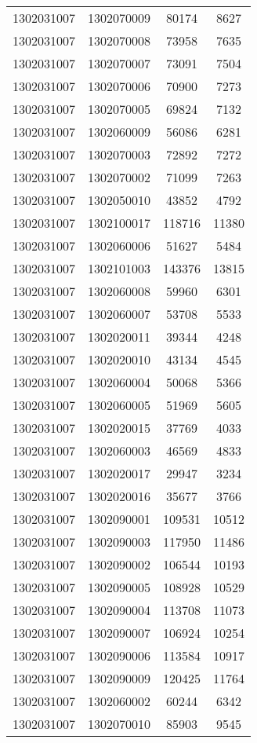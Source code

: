 \begin{longtable}[h]{llcc}
		1302031007 & 1302070009 & 80174 & 8627\\
		1302031007 & 1302070008 & 73958 & 7635\\
		1302031007 & 1302070007 & 73091 & 7504\\
		1302031007 & 1302070006 & 70900 & 7273\\
		1302031007 & 1302070005 & 69824 & 7132\\
		1302031007 & 1302060009 & 56086 & 6281\\
		1302031007 & 1302070003 & 72892 & 7272\\
		1302031007 & 1302070002 & 71099 & 7263\\
		1302031007 & 1302050010 & 43852 & 4792\\
		1302031007 & 1302100017 & 118716 & 11380\\
		1302031007 & 1302060006 & 51627 & 5484\\
		1302031007 & 1302101003 & 143376 & 13815\\
		1302031007 & 1302060008 & 59960 & 6301\\
		1302031007 & 1302060007 & 53708 & 5533\\
		1302031007 & 1302020011 & 39344 & 4248\\
		1302031007 & 1302020010 & 43134 & 4545\\
		1302031007 & 1302060004 & 50068 & 5366\\
		1302031007 & 1302060005 & 51969 & 5605\\
		1302031007 & 1302020015 & 37769 & 4033\\
		1302031007 & 1302060003 & 46569 & 4833\\
		1302031007 & 1302020017 & 29947 & 3234\\
		1302031007 & 1302020016 & 35677 & 3766\\
		1302031007 & 1302090001 & 109531 & 10512\\
		1302031007 & 1302090003 & 117950 & 11486\\
		1302031007 & 1302090002 & 106544 & 10193\\
		1302031007 & 1302090005 & 108928 & 10529\\
		1302031007 & 1302090004 & 113708 & 11073\\
		1302031007 & 1302090007 & 106924 & 10254\\
		1302031007 & 1302090006 & 113584 & 10917\\
		1302031007 & 1302090009 & 120425 & 11764\\
		1302031007 & 1302060002 & 60244 & 6342\\
		1302031007 & 1302070010 & 85903 & 9545\\

\end{longtable}
